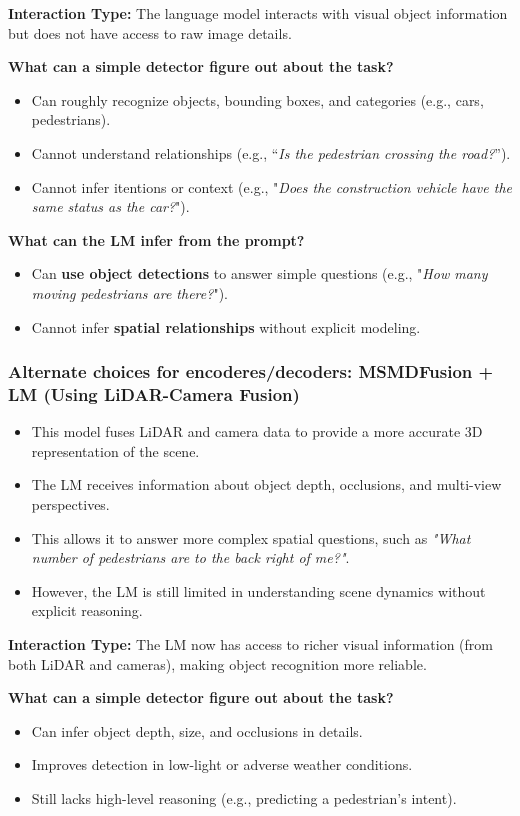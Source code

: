 \documentclass{article} %
\begin{document}
	\noindent \textbf{Interaction Type:} The language model interacts with visual object information but does not have access to raw image details.
	
	\noindent \textbf{What can a simple detector figure out about the task?}
	\begin{itemize}
		\item Can roughly recognize objects, bounding boxes, and categories (e.g., cars, pedestrians).
		\item Cannot understand relationships (e.g., “\textit{Is the pedestrian crossing the road?}”).
		\item Cannot infer itentions or context (e.g., "\textit{Does the construction vehicle have the same status as the car?}").
	\end{itemize}
	
	\noindent \textbf{What can the LM infer from the prompt?}
	\begin{itemize}
		\item Can \textbf{use object detections} to answer simple questions (e.g., "\textit{How many moving pedestrians are there?}").
		\item Cannot infer \textbf{spatial relationships} without explicit modeling.
	\end{itemize}
	
	\subsubsection{\textbf{Alternate choices for encoderes/decoders: MSMDFusion + LM (Using LiDAR-Camera Fusion)}}
	\begin{itemize}
		\item This model fuses LiDAR and camera data to provide a more accurate 3D representation of the scene.
		\item The LM receives information about object depth, occlusions, and multi-view perspectives.
		\item This allows it to answer more complex spatial questions, such as \textit{"What number of pedestrians are to the back right of me?"}.
		\item However, the LM is still limited in understanding scene dynamics without explicit reasoning.
	\end{itemize}
	
	\noindent \textbf{Interaction Type:} The LM now has access to richer visual information (from both LiDAR and cameras), making object recognition more reliable.
	
	\noindent \textbf{What can a simple detector figure out about the task?}
	\begin{itemize}
		\item Can infer object depth, size, and occlusions in details.
		\item Improves detection in low-light or adverse weather conditions.
		\item Still lacks high-level reasoning (e.g., predicting a pedestrian’s intent).
	\end{itemize}
	
\end{document}
